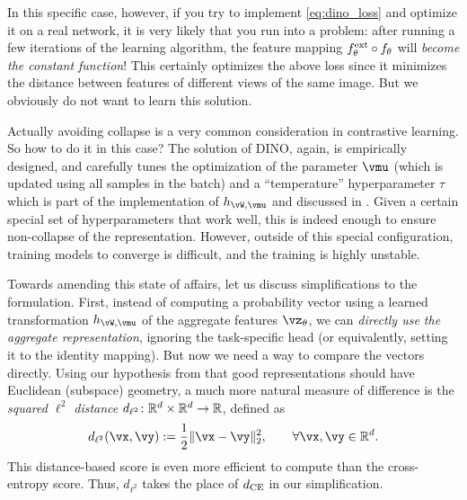 \documentclass[../../book-main.tex]{subfiles}
\begin{document}
In this specific case, however, if you try to implement \eqref{eq:dino_loss} and optimize it on a real network, it is very likely that you run into a problem: after running a few iterations of the learning algorithm, the feature mapping \(f_{\theta}^{\mathrm{ext}} \circ f_{\theta}\) will \textit{become the constant function}! This certainly optimizes the above loss since it minimizes the distance between features of different views of the same image. But we obviously do not want to learn this solution. 

Actually avoiding collapse is a very common consideration in contrastive learning. So how to do it in this case? The solution of DINO, again, is empirically designed, and carefully tunes the optimization of the parameter \(\vmu\) (which is updated using all samples in the batch) and a ``temperature'' hyperparameter \(\tau\) which is part of the implementation of \(h_{\vW, \vmu}\) and discussed in . Given a certain special set of hyperparameters that work well, this is indeed enough to ensure non-collapse of the representation. However, outside of this special configuration, training models to converge is difficult, and the training is highly unstable. 

Towards amending this state of affairs, let us discuss simplifications to the formulation. First, instead of computing a probability vector using a learned transformation \(h_{\vW, \vmu}\) of the aggregate features \(\vz_{\theta}\), we can \textit{directly use the aggregate representation}, ignoring the task-specific head (or equivalently, setting it to the identity mapping). But now we need a way to compare the vectors directly. Using our hypothesis from  that good representations should have Euclidean (subspace) geometry, a much more natural measure of difference is the \textit{squared \(\ell^{2}\) distance} \(d_{\ell^{2}} \colon \mathbb{R}^{d} \times \mathbb{R}^{d} \to \mathbb{R}\), defined as 
\begin{equation}\label{eq:cosine_similarity}
    d_{\ell^{2}}(\vx, \vy) := \frac{1}{2}\norm{\vx - \vy}_{2}^{2}, \qquad  \forall \vx, \vy \in \R^{d}.
\end{equation}
This distance-based score is even more efficient to compute than the cross-entropy score. Thus, \(d_{\ell^{2}}\) takes the place of \(d_{\operatorname{CE}}\) in our simplification. 
\end{document}
